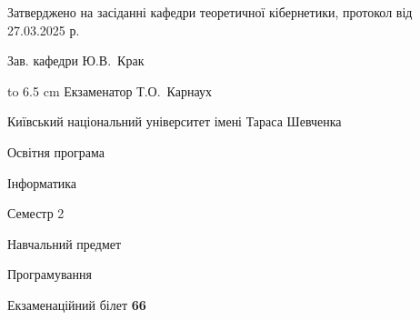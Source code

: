 \documentclass[12pt, ukrainian]{article}
\begin{document}
{\smallskip\smallskip \begin {scriptsize} Затверджено на засіданні кафедри теоретичної кібернетики, протокол   від   27.03.2025 р.\par\smallskip\smallskip\smallskip\smallskip
{\parbox {6.5 cm} {Зав. кафедри \dotfill Ю.В.~Крак}}\hspace {0.7cm} {\hbox to 6.5 cm { Екзаменатор \dotfill Т.О.~Карнаух}} \end{scriptsize}}
\newpage
{{\begin {scriptsize}\par
{ \center  Київський національний університет імені Тараса Шевченка \par}
{\parbox {5 cm}{Освітня програма \hfill}{\parbox {7 cm}{Інформатика\hfill}}\parbox {6 cm}{\hfill Семестр 2}}\par
{\parbox {5 cm} {Навчальний предмет \hfill}\parbox {7 cm}{Програмування \hfill}\parbox {6cm}{\hfill}\par}\vspace{-15pt} \end{scriptsize}}{\center Екзаменаційний білет \No \textbf { 66 }\par}}
\end{document}
